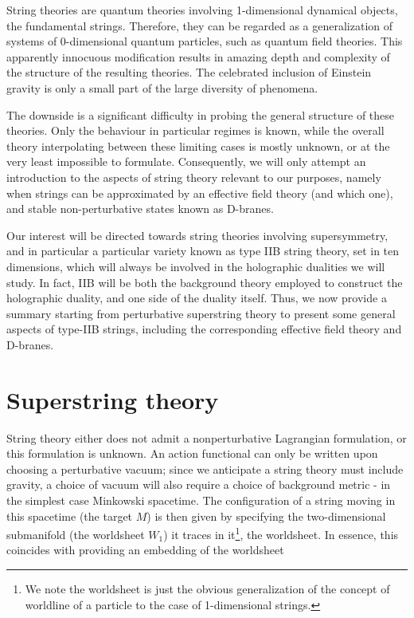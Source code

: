 String theories are quantum theories involving 1-dimensional dynamical objects, the fundamental strings. Therefore, they can be regarded as a generalization of systems of 0-dimensional quantum particles, such as quantum field theories. This apparently innocuous modification results in amazing depth and complexity of the structure of the resulting theories. The celebrated inclusion of Einstein gravity is only a small part of the large diversity of phenomena. 

The downside is a significant difficulty in probing the general structure of these theories. Only the behaviour in particular regimes is known, while the overall theory interpolating between these limiting cases is mostly unknown, or at the very least impossible to formulate. Consequently, we will only attempt an introduction to the aspects of string theory relevant to our purposes, namely when strings can be approximated by an effective field theory (and which one), and stable non-perturbative states known as D-branes.

Our interest will be directed towards string theories involving supersymmetry, and in particular a particular variety known as type IIB string theory, set in ten dimensions, which will always be involved in the holographic dualities we will study. In fact, IIB will be both the background theory employed to construct the holographic duality, and one side of the duality itself. Thus, we now provide a summary starting from perturbative superstring theory to present some general aspects of type-IIB strings, including the corresponding effective field theory and D-branes.

\section{Superstring theory}

String theory either does not admit a nonperturbative Lagrangian formulation, or this formulation is unknown. An action functional can only be written upon choosing a perturbative vacuum; since we anticipate a string theory must include gravity, a choice of vacuum will also require a choice of background metric - in the simplest case Minkowski spacetime. The configuration of a string moving in this spacetime (the target $M$) is then given by specifying the two-dimensional submanifold (the worldsheet $W_1$) it traces in it\footnote{We note the worldsheet is just the obvious generalization of the concept of worldline of a particle to the case of 1-dimensional strings.}, the worldsheet. In essence, this coincides with providing an embedding of the worldsheet

